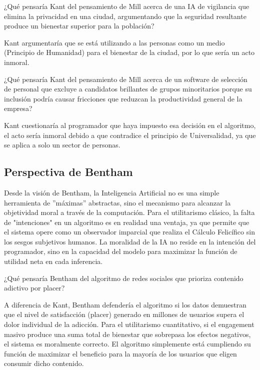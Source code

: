 \medskip

¿Qué pensaría Kant del pensamiento de Mill acerca de una IA de vigilancia que elimina la privacidad en una ciudad, argumentando que la seguridad resultante produce un bienestar superior para la población?

Kant argumentaría que se está utilizando a las personas como un medio (Principio de Humanidad) para el bienestar de la ciudad, por lo que sería un acto inmoral.

\medskip

¿Qué pensaría Kant del pensamiento de Mill acerca de un software de selección de personal que excluye a candidatos brillantes de grupos minoritarios porque su inclusión podría causar fricciones que reduzcan la productividad general de la empresa?

Kant cuestionaría al programador que haya impuesto esa decisión en el algoritmo, el acto sería inmoral debido a que contradice el principio de Universalidad, ya que se aplica a solo un sector de personas.

\subsection{Perspectiva de Bentham}

Desde la visión de Bentham, la Inteligencia Artificial no es una simple herramienta de ''máximas'' abstractas, sino el mecanismo para alcanzar la objetividad moral a través de la computación. Para el utilitarismo clásico, la falta de "intenciones" en un algoritmo es en realidad una ventaja, ya que permite que el sistema opere como un observador imparcial que realiza el Cálculo Felicífico sin los sesgos subjetivos humanos. La moralidad de la IA no reside en la intención del programador, sino en la capacidad del modelo para maximizar la función de utilidad neta en cada inferencia.

\medskip

¿Qué pensaría Bentham del algoritmo de redes sociales que prioriza contenido adictivo por placer?

A diferencia de Kant, Bentham defendería el algoritmo si los datos demuestran que el nivel de satisfacción (placer) generado en millones de usuarios supera el dolor individual de la adicción. Para el utilitarismo cuantitativo, si el engagement masivo produce una suma total de bienestar que sobrepasa los efectos negativos, el sistema es moralmente correcto. El algoritmo simplemente está cumpliendo su función de maximizar el beneficio para la mayoría de los usuarios que eligen consumir dicho contenido.

